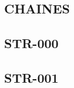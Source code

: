\begin{multicols}{2}

\section*{CHAINES}
\newcommand{\xxexo}{STR-000}
\subsection*{\xxexo}
\graphicspath{{../../exos/chaines/\xxexo/}}


\renewcommand{\xxexo}{STR-001}
\subsection*{\xxexo}
\graphicspath{{../../exos/chaines/\xxexo/}}

\end{multicols}



